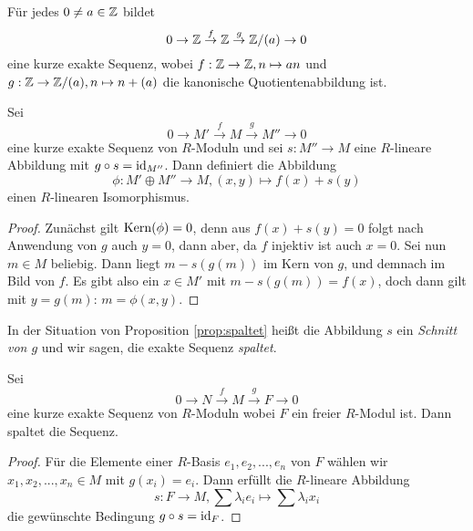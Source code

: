 \documentclass{book}
\begin{document}
\begin{exa}
    \label{exa:ses}
    Für jedes $0 \ne a \in \mathbb{Z}$ bildet
    \[
        0 \to \mathbb{Z} \overset{f}{\to} \mathbb{Z} \overset{g}{\to} \mathbb{Z}/(a) \to 0
    \]
    eine kurze exakte Sequenz, wobei $f: \mathbb{Z} \to \mathbb{Z}, n \mapsto an$ und $g: \mathbb{Z}
    \to \mathbb{Z}/(a), n \mapsto n + (a)$ die kanonische Quotientenabbildung ist. 
\end{exa}

\begin{prop}
    \label{prop:spaltet} Sei 
    \[
        0 \to M' \overset{f}{\to} M \overset{g}{\to} M'' \to 0
    \]
    eine kurze exakte Sequenz von $R$-Moduln und sei $s: M'' \to M$ eine
    $R$-lineare Abbildung mit $g \circ s = \operatorname{id}_{M''}$. Dann definiert die Abbildung
    \begin{equation}
        \label{eq:splitsum}
            \phi: M' \oplus M'' \to M, (x,y) \mapsto f(x) + s(y)
    \end{equation}
    einen $R$-linearen Isomorphismus.
\end{prop}
\begin{proof}
    Zunächst gilt $\Kern(\phi) = 0$, denn aus $f(x) + s(y) = 0$ folgt nach
    Anwendung von $g$ auch $y=0$, dann aber, da $f$ injektiv ist auch $x=0$.
    Sei nun $m \in M$ beliebig. Dann liegt $m - s(g(m))$ im Kern von $g$, und
    demnach im Bild von $f$. Es gibt also ein $x \in M'$ mit $m - s(g(m)) =
    f(x)$, doch dann gilt mit $y = g(m)$: $m = \phi(x,y)$. 
\end{proof}

\begin{rem}
    \label{rem:spaltet}
    In der Situation von Proposition \ref{prop:spaltet} heißt die Abbildung $s$
    ein {\em Schnitt von $g$} und wir sagen, die exakte Sequenz {\em spaltet}.
\end{rem}

\begin{prop}
    \label{prop:freesplit}
    Sei 
    \[
        0 \to N \overset{f}{\to} M \overset{g}{\to} F \to 0
    \]
    eine kurze exakte Sequenz von $R$-Moduln wobei $F$ ein freier $R$-Modul ist.
    Dann spaltet die Sequenz. 
\end{prop}
\begin{proof}
    Für die Elemente einer $R$-Basis $e_1, e_2, ..., e_n$ von $F$ wählen wir
    $x_1, x_2, ..., x_n \in M$ mit $g(x_i) = e_i$. Dann erfüllt die $R$-lineare Abbildung
    \[
        s: F \to M, \sum \lambda_i e_i \mapsto \sum \lambda_i x_i
    \]
    die gewünschte Bedingung $g \circ s = \operatorname{id}_F$. 
\end{proof}
\end{document}
